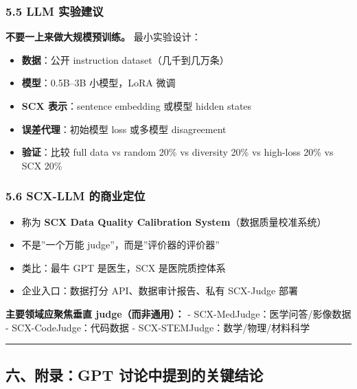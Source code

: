 \documentclass[
  12pt,
]{ctexart}
\providecommand{\tightlist}{%
  \setlength{\itemsep}{0pt}\setlength{\parskip}{0pt}}
\begin{document}
\subsubsection{5.5 LLM 实验建议}\label{llm-ux5b9eux9a8cux5efaux8bae}

\textbf{不要一上来做大规模预训练。} 最小实验设计：

\begin{itemize}
\tightlist
\item
  \textbf{数据}：公开 instruction dataset（几千到几万条）
\item
  \textbf{模型}：0.5B--3B 小模型，LoRA 微调
\item
  \textbf{SCX 表示}：sentence embedding 或模型 hidden states
\item
  \textbf{误差代理}：初始模型 loss 或多模型 disagreement
\item
  \textbf{验证}：比较 full data vs random 20\% vs diversity 20\% vs
  high-loss 20\% vs SCX 20\%
\end{itemize}

\subsubsection{5.6 SCX-LLM
的商业定位}\label{scx-llm-ux7684ux5546ux4e1aux5b9aux4f4d}

\begin{itemize}
\tightlist
\item
  称为 \textbf{SCX Data Quality Calibration System}（数据质量校准系统）
\item
  不是''一个万能 judge''，而是''评价器的评价器''
\item
  类比：最牛 GPT 是医生，SCX 是医院质控体系
\item
  企业入口：数据打分 API、数据审计报告、私有 SCX-Judge 部署
\end{itemize}

\textbf{主要领域应聚焦垂直 judge（而非通用）：} -
SCX-MedJudge：医学问答/影像数据 - SCX-CodeJudge：代码数据 -
SCX-STEMJudge：数学/物理/材料科学

\begin{center}\rule{0.5\linewidth}{0.5pt}\end{center}

\subsection{六、附录：GPT
讨论中提到的关键结论}\label{ux516dux9644ux5f55gpt-ux8ba8ux8bbaux4e2dux63d0ux5230ux7684ux5173ux952eux7ed3ux8bba}
\end{document}
